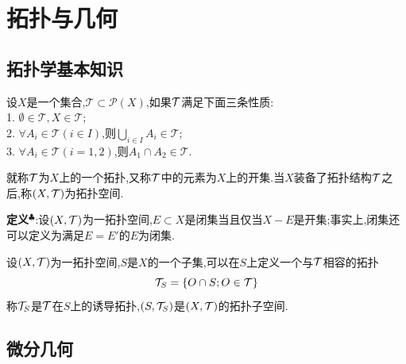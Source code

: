 \newpage
\section{拓扑与几何}
\subsection{拓扑学基本知识}
\begin{tcolorbox}[colback=KuangNei,colframe=BianKuang,title=\textbf{拓扑空间},sharpish corners]
    设$X$是一个集合,$\mathcal{T} \subset \mathcal{P} (X)$,如果$\mathcal{T}$满足下面三条性质:\\
    1. $\emptyset \in \mathcal{T},X\in \mathcal{T}$;\\
    2. $\forall A_i \in \mathcal{T} (i\in I)$,则$\bigcup_{i\in I}A_i \in \mathcal{T}$;\\
    3. $\forall A_i \in \mathcal{T} (i=1,2)$,则$A_1\cap A_2 \in \mathcal{T}$.
\end{tcolorbox}
就称$\mathcal{T}$为$X$上的一个拓扑,又称$\mathcal{T}$中的元素为$X$上的开集.当$X$装备了拓扑结构$\mathcal{T}$之后,称$(X,\mathcal{T})$为拓扑空间.\par
\textbf{定义}$^\clubsuit $:设$(X,\mathcal{T})$为一拓扑空间,$E\subset X$是闭集当且仅当$X-E$是开集;事实上,闭集还可以定义为满足$E=E'$的$E$为闭集.\par
设$(X,\mathcal{T})$为一拓扑空间,$S$是$X$的一个子集,可以在$S$上定义一个与$\mathcal{T}$相容的拓扑
$$
\mathcal{T} _{S}=\{O\cap S;O\in\mathcal{T}\}
$$
称$\mathcal{T} _{S}$是$\mathcal{T}$在$S$上的诱导拓扑,$(S,\mathcal{T} _{S})$是$(X,\mathcal{T})$的拓扑子空间.\par


\subsection{微分几何}
